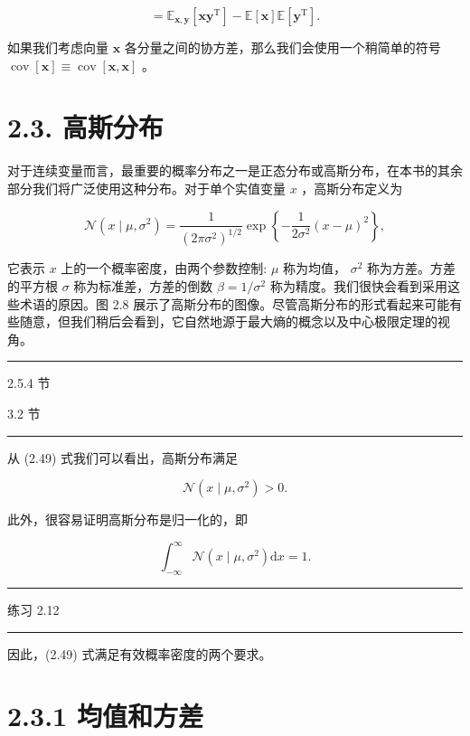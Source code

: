 \documentclass[10pt]{article}
\newcommand{\HRule}{\begin{center}\rule{0.9\linewidth}{0.2mm}\end{center}}
\begin{document}
\[
= {\mathbb{E}}_{\mathbf{x},\mathbf{y}}\left\lbrack  {\mathbf{{xy}}}^{\mathrm{T}}\right\rbrack   - \mathbb{E}\left\lbrack  \mathbf{x}\right\rbrack  \mathbb{E}\left\lbrack  {\mathbf{y}}^{\mathrm{T}}\right\rbrack  . \tag{2.48}
\]

如果我们考虑向量 \(\mathbf{x}\) 各分量之间的协方差，那么我们会使用一个稍简单的符号 \(\operatorname{cov}\left\lbrack  \mathbf{x}\right\rbrack   \equiv  \operatorname{cov}\left\lbrack  {\mathbf{x},\mathbf{x}}\right\rbrack\) 。

\section*{2.3. 高斯分布}

对于连续变量而言，最重要的概率分布之一是正态分布或高斯分布，在本书的其余部分我们将广泛使用这种分布。对于单个实值变量 \(x\) ，高斯分布定义为

\[
\mathcal{N}\left( {x \mid  \mu ,{\sigma }^{2}}\right)  = \frac{1}{{\left( 2\pi {\sigma }^{2}\right) }^{1/2}}\exp \left\{  {-\frac{1}{2{\sigma }^{2}}{\left( x - \mu \right) }^{2}}\right\}  , \tag{2.49}
\]

它表示 \(x\) 上的一个概率密度，由两个参数控制: \(\mu\) 称为均值， \({\sigma }^{2}\) 称为方差。方差的平方根 \(\sigma\) 称为标准差，方差的倒数 \(\beta  = 1/{\sigma }^{2}\) 称为精度。我们很快会看到采用这些术语的原因。图 2.8 展示了高斯分布的图像。尽管高斯分布的形式看起来可能有些随意，但我们稍后会看到，它自然地源于最大熵的概念以及中心极限定理的视角。

\HRule

2.5.4 节

3.2 节

\HRule

从 (2.49) 式我们可以看出，高斯分布满足

\[
\mathcal{N}\left( {x \mid  \mu ,{\sigma }^{2}}\right)  > 0. \tag{2.50}
\]

此外，很容易证明高斯分布是归一化的，即

\[
{\int }_{-\infty }^{\infty }\mathcal{N}\left( {x \mid  \mu ,{\sigma }^{2}}\right) \mathrm{d}x = 1. \tag{2.51}
\]

\HRule

练习 2.12

\HRule

因此，(2.49) 式满足有效概率密度的两个要求。

\section*{2.3.1 均值和方差}
\end{document}

